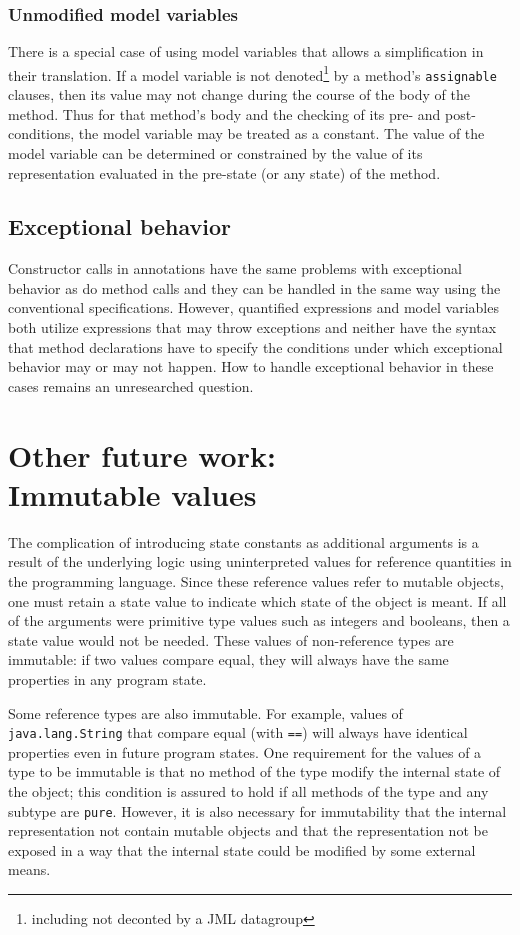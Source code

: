 \documentclass{sig-alternate}
\begin{document}
\subsubsection{Unmodified model variables}

There is a special case of using model variables that allows a simplification in their translation.
If a model variable is not denoted\footnote{including not deconted by a JML datagroup} by a
method's \texttt{assignable} clauses, then its value may not change during the course of the
body of the method.  Thus for that method's body and the checking of its pre- and
post-conditions, the model variable may be treated as a constant.  The value of the model 
variable can be determined or 
constrained by the value of its representation evaluated in the pre-state
(or any state) of the method.

\subsection{Exceptional behavior}

Constructor calls in annotations have the same problems with exceptional behavior as do
method calls and they can be handled in the same way using the conventional specifications.
However, quantified expressions and model variables both utilize expressions that may
throw exceptions and neither have the syntax that method declarations have to 
specify the conditions under which exceptional behavior may or may not happen.  How to
handle exceptional behavior in these cases remains
an unresearched question.

\section{Other future work: \\ Immutable values}

The complication of introducing state constants as additional arguments is a result of the underlying logic using uninterpreted values for reference quantities in the programming language.
Since these reference values refer to mutable objects, one must retain a state value to 
indicate which state of the object is meant.  If all of the arguments were primitive type values
such as integers and booleans, then a state value would not be needed.  These values of
non-reference types are immutable: if two values compare equal, they will always have the same
properties in any program state. 

Some reference types are also immutable.  For example, values of \texttt{java.lang.String} that
compare equal (with \texttt{==}) will always have identical properties even in future program
states.  One requirement for the values of a type to be immutable is that no method of the type
modify the internal state of the object; this condition is assured to hold if all methods of the 
type and any subtype are
\texttt{pure}.  However, it is also 
necessary for immutability
that the internal representation not contain mutable objects and
that the representation not be exposed  in a way that the internal state could be modified by 
some external means.
\end{document}
